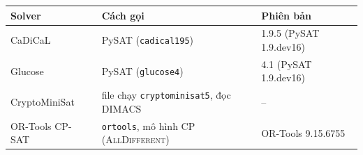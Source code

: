 \begin{tabular}{lll}
\toprule
Solver & Cách gọi & Phiên bản\\
\midrule
CaDiCaL~\citep{biere2020} & PySAT (\texttt{cadical195}) & 1.9.5 (PySAT 1.9.dev16)\\
Glucose~\citep{audemard2009} & PySAT (\texttt{glucose4}) & 4.1 (PySAT 1.9.dev16)\\
CryptoMiniSat~\citep{soos2009} & file chạy \texttt{cryptominisat5}, đọc DIMACS & --\\
\midrule
OR-Tools CP-SAT~\citep{cpsat} & \texttt{ortools}, mô hình CP (\textsc{AllDifferent}) & OR-Tools 9.15.6755\\
\bottomrule
\end{tabular}
